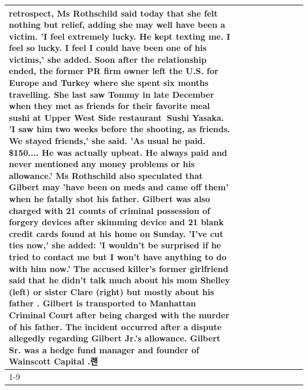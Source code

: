 \begin{table}[H]
\begin{tabular}{lllrlllll}
retrospect, Ms Rothschild said today that she felt nothing but relief, adding she may well have been a victim. 'I feel extremely lucky. He kept texting me. I feel so lucky. I feel I could have been one of his victims,' she added. Soon after the relationship ended, the former PR firm owner left the U.S. for Europe and Turkey where she spent six months  travelling. She last saw Tommy in late December when they met as friends for their favorite meal sushi at Upper West Side restaurant Sushi Yasaka. 'I saw him two weeks before the shooting, as friends. We stayed friends,' she said. 'As usual he paid. \$150.... He was actually upbeat. He always paid and never mentioned any money problems or his allowance.' Ms Rothschild also speculated that Gilbert may 'have been on meds and came off them' when he fatally shot his father. Gilbert was also charged with 21 counts of criminal possession of forgery devices after skimming device and 21 blank credit cards found at his home on Sunday. 'I've cut ties now,' she added: 'I wouldn’t be surprised if he tried to contact me but I won’t have anything to do with him now.' The accused killer's former girlfriend said that he didn't talk much about his mom Shelley (left) or sister Clare (right) but mostly about his father . Gilbert is transported to Manhattan Criminal Court  after being charged with the murder of his father. The incident occurred after a dispute allegedly regarding Gilbert Jr.'s allowance. Gilbert Sr. was a hedge fund manager and founder of Wainscott Capital .랜 \\
\cline{1-9}

\end{tabular}
\end{table}

